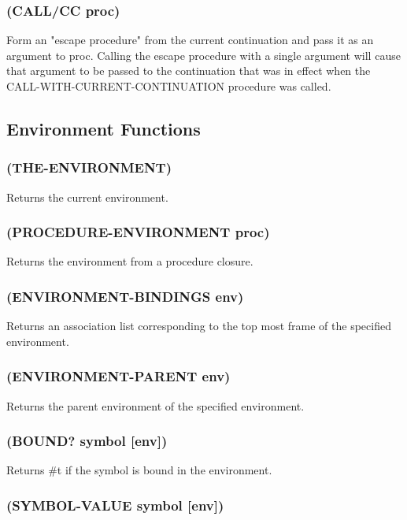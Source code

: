 \documentclass[11pt]{article}
\begin{document}
\subsubsection{(CALL/CC proc)}
\label{sec-4-39-6}

Form an "escape procedure" from the current continuation and pass it
as an argument to proc.  Calling the escape procedure with a single
argument will cause that argument to be passed to the continuation
that was in effect when the CALL-WITH-CURRENT-CONTINUATION procedure
was called.
\subsection{Environment Functions}
\label{sec-4-40}

\subsubsection{(THE-ENVIRONMENT)}
\label{sec-4-40-1}

Returns the current environment.
\subsubsection{(PROCEDURE-ENVIRONMENT proc)}
\label{sec-4-40-2}

Returns the environment from a procedure closure.
\subsubsection{(ENVIRONMENT-BINDINGS env)}
\label{sec-4-40-3}

Returns an association list corresponding to the top most frame of
the specified environment.
\subsubsection{(ENVIRONMENT-PARENT env)}
\label{sec-4-40-4}

Returns the parent environment of the specified environment.
\subsubsection{(BOUND? symbol [env])}
\label{sec-4-40-5}

Returns \#t if the symbol is bound in the environment.
\subsubsection{(SYMBOL-VALUE symbol [env])}
\label{sec-4-40-6}
\end{document}
